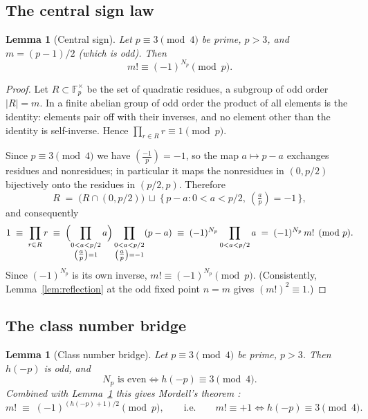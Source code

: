 \documentclass[11pt]{article}
\newtheorem{lemma}[theorem]{Lemma}
\theoremstyle{definition}
\theoremstyle{remark}
\newcommand{\F}{\mathbb{F}}
\newcommand{\legendre}[2]{\left(\tfrac{#1}{#2}\right)}
\begin{document}
\subsection{The central sign law}

\begin{lemma}[Central sign]\label{lem:centralsign}
Let $p \equiv 3 \pmod 4$ be prime, $p > 3$, and $m = (p-1)/2$ (which is odd).
Then
\[
  m! \equiv (-1)^{N_p} \pmod p .
\]
\end{lemma}

\begin{proof}
Let $R \subset \F_p^\times$ be the set of quadratic residues, a subgroup of
odd order $|R| = m$. In a finite abelian group of odd order the product of
all elements is the identity: elements pair off with their inverses, and no
element other than the identity is self-inverse. Hence
$\prod_{r \in R} r \equiv 1 \pmod p$.

Since $p \equiv 3 \pmod 4$ we have $\legendre{-1}{p} = -1$, so the map
$a \mapsto p - a$ exchanges residues and nonresidues; in particular it maps
the nonresidues in $(0, p/2)$ bijectively onto the residues in $(p/2, p)$.
Therefore
\[
  R \;=\; \bigl(R \cap (0, p/2)\bigr) \ \sqcup \
  \bigl\{\, p - a : 0 < a < p/2, \ \legendre{a}{p} = -1 \,\bigr\},
\]
and consequently
\[
  1 \;\equiv\; \prod_{r \in R} r
  \;\equiv\;
  \Bigl(\prod_{\substack{0 < a < p/2 \\ \legendre{a}{p} = 1}} a\Bigr)
  \prod_{\substack{0 < a < p/2 \\ \legendre{a}{p} = -1}} (p - a)
  \;\equiv\;
  (-1)^{N_p} \prod_{0 < a < p/2} a
  \;=\; (-1)^{N_p} \, m! \pmod p .
\]
Since $(-1)^{N_p}$ is its own inverse, $m! \equiv (-1)^{N_p} \pmod p$.
(Consistently, Lemma~\ref{lem:reflection} at the odd fixed point $n = m$
gives $(m!)^2 \equiv 1$.)
\end{proof}

\subsection{The class number bridge}

\begin{lemma}[Class number bridge]\label{lem:bridge}
Let $p \equiv 3 \pmod 4$ be prime, $p > 3$. Then $h(-p)$ is odd, and
\[
  N_p \text{ is even} \iff h(-p) \equiv 3 \pmod 4 .
\]
Combined with Lemma~\ref{lem:centralsign} this gives Mordell's theorem
\emph{\cite{Mordell}}:
\[
  m! \;\equiv\; (-1)^{(h(-p)+1)/2} \pmod p ,
  \qquad\text{i.e.}\qquad
  m! \equiv +1 \iff h(-p) \equiv 3 \pmod 4 .
\]
\end{lemma}
\end{document}
